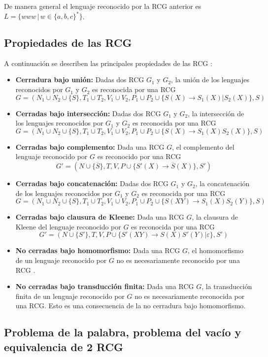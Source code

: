 De manera general el lenguaje reconocido por la RCG anterior es $L=\{www\,|\,w\in \{a,b,c\}^*\}$.

\subsection{Propiedades de las RCG}

A continuación se describen las principales propiedades de las RCG \cite{propertiesRCGBib}:
\begin{itemize}
    \item \textbf{Cerradura bajo unión:} Dadas dos RCG $G_1$ y $G_2$, la unión de los lenguajes reconocidos por $G_1$ y $G_2$ es reconocida por una RCG
          $$G=(N_1\cup N_2\cup \{S\},T_1\cup T_2,V_1\cup V_2,P_1\cup P_2\cup \{S(X)\to S_1(X)|S_2(X)\},S)$$
    \item \textbf{Cerradas bajo intersección:} Dadas dos RCG $G_1$ y $G_2$, la intersección de los lenguajes reconocidos por $G_1$ y $G_2$ es reconocida por una RCG
          $$G=(N_1\cup N_2\cup \{S\},T_1\cup T_2,V_1\cup V_2,P_1\cup P_2\cup \{S(X)\to S_1(X)S_2(X)\},S)$$
    \item \textbf{Cerradas bajo complemento:} Dada una RCG $G$, el complemento del lenguaje reconocido por $G$ es reconocido por una RCG
          $$G'=(N\cup \{\overline{S}\},T,V,P\cup \{S'(X)\to \overline{S}(X)\},S')$$
    \item \textbf{Cerradas bajo concatenación:} Dadas dos RCG $G_1$ y $G_2$, la concatenación de los lenguajes reconocidos por $G_1$ y $G_2$ es reconocida por una RCG
          $$G=(N_1\cup N_2\cup \{S\},T_1\cup T_2,V_1\cup V_2,P_1\cup P_2\cup \{S(XY)\to S_1(X)S_2(Y)\},S)$$
    \item \textbf{Cerradas bajo clausura de Kleene:} Dada una RCG $G$, la clausura de Kleene del lenguaje reconocido por $G$ es reconocida por una RCG
          $$G'=(N\cup \{S'\},T,V,P\cup \{S'(XY)\to S(X)S'(Y)|\varepsilon\},S')$$
    \item  \textbf{No cerradas bajo homomorfismo:} Dada una RCG $G$, el homomorfismo de un lenguaje reconocido por $G$ no es necesariamente reconocido por una RCG \cite{propertiesRCGBib}.
    \item  \textbf{No cerradas bajo transducción finita:} Dada una RCG $G$, la transducción finita de un lenguaje reconocido por $G$ no es necesariamente reconocida por una RCG.
          Esto es una consecuencia de la no cerradura bajo homomorfismo.
\end{itemize}


\subsection{Problema de la palabra, problema del vacío y equivalencia de 2 RCG}

